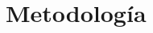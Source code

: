 \documentclass[conference]{IEEEtran}
\begin{document}






\section{Metodología}









\end{document}
